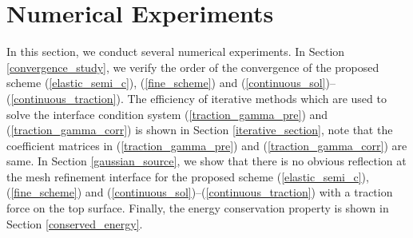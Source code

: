 \section{Numerical Experiments}
In this section, we conduct several numerical experiments. In Section \ref{convergence_study}, we verify the order of the convergence of the proposed scheme (\ref{elastic_semi_c}), (\ref{fine_scheme}) and (\ref{continuous_sol})--(\ref{continuous_traction}). The efficiency of iterative methods which are used to solve the interface condition system (\ref{traction_gamma_pre}) and (\ref{traction_gamma_corr}) is shown in Section \ref{iterative_section}, note that the coefficient matrices in (\ref{traction_gamma_pre}) and (\ref{traction_gamma_corr}) are same. In Section \ref{gaussian_source}, we show that there is no obvious reflection at the mesh refinement interface for the proposed scheme (\ref{elastic_semi_c}), (\ref{fine_scheme}) and (\ref{continuous_sol})--(\ref{continuous_traction}) with a traction force on the top surface. Finally, the energy conservation property is shown in Section \ref{conserved_energy}.